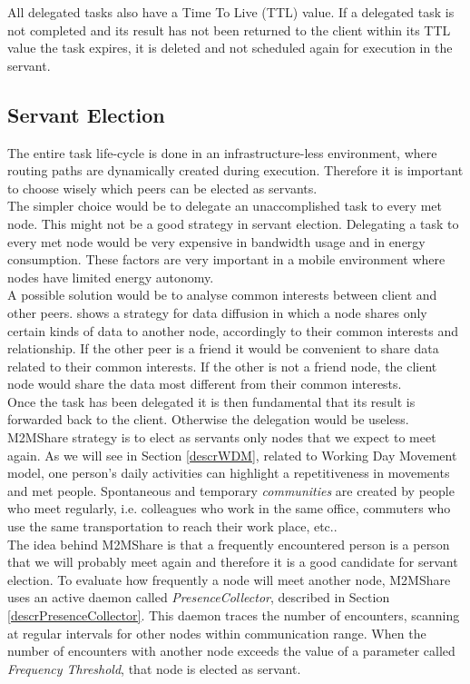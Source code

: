All delegated tasks also have a Time To Live (TTL) value. If a delegated task is not completed and its result has not been returned to the client within its TTL value the task expires, it is deleted and not scheduled again for execution in the servant.
\\

\subsection{Servant Election}
The entire task life-cycle is done in an infrastructure-less environment, where routing paths are dynamically created during execution. Therefore it is important to choose wisely which peers can be elected as servants.
\\

The simpler choice would be to delegate an unaccomplished task to every met node. This might not be a good strategy in servant election. Delegating a task to every met node would be very expensive in bandwidth usage and in energy consumption. These factors are very important in a mobile environment where nodes have limited energy autonomy. 
\\

A possible solution would be to analyse common interests between client and other peers. \cite{socialNetworks} shows a strategy for data diffusion in which a node shares only certain kinds of data to another node, accordingly to their common interests and relationship. If the other peer is a friend it would be convenient to share data related to their common interests. If the other is not a friend node, the client node would share the data most different from their common interests.
\\

Once the task has been delegated it is then fundamental that its result is forwarded back to the client. Otherwise the delegation would be useless. M2MShare strategy is to elect as servants only nodes that we expect to meet again. As we will see in Section \ref{descrWDM}, related to Working Day Movement model, one person's daily activities can highlight a repetitiveness in movements and met people. Spontaneous and temporary \textit{communities} are created by people who meet regularly, i.e. colleagues who work in the same office, commuters who use the same transportation to reach their work place, etc..
\\

The idea behind M2MShare is that a frequently encountered person is a person that we will probably meet again and therefore it is a good candidate for servant election. To evaluate how frequently a node will meet another node, M2MShare uses an active daemon called \textit{PresenceCollector}, described in Section \ref{descrPresenceCollector}. This daemon traces the number of encounters, scanning at regular intervals for other nodes within communication range. When the number of encounters with another node exceeds the value of a parameter called \textit{Frequency Threshold}, that node is elected as servant.
\\

